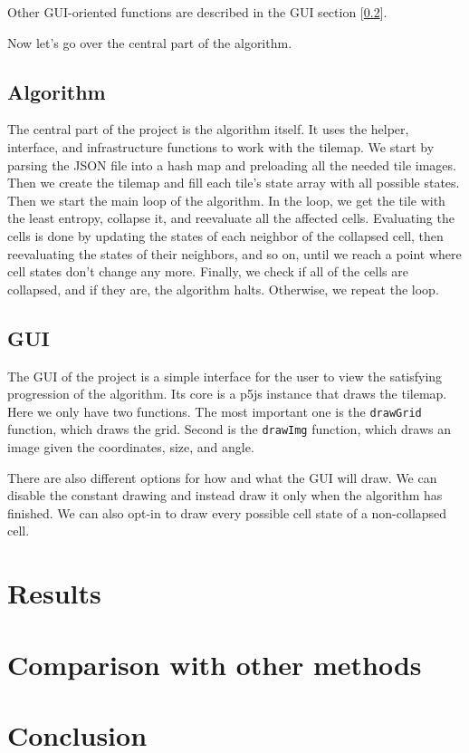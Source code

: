 \documentclass[10pt,twoside,a4paper]{article}
\begin{document}
Other GUI-oriented functions are described in the GUI section [\ref*{sec:gui}].

Now let's go over the central part of the algorithm.


\subsection{Algorithm}\label{sec:algorithm}
The central part of the project is the algorithm itself.
It uses the helper, interface, and infrastructure functions to work with the tilemap.
We start by parsing the JSON file into a hash map and preloading all the needed tile images.
Then we create the tilemap and fill each tile's state array with all possible states.
Then we start the main loop of the algorithm.
In the loop, we get the tile with the least entropy, collapse it, and reevaluate all the affected cells.
Evaluating the cells is done by updating the states of each neighbor of the collapsed cell, then reevaluating the states of their neighbors, and so on, until we reach a point where cell states don't change any more.
Finally, we check if all of the cells are collapsed, and if they are, the algorithm halts.
Otherwise, we repeat the loop.

\subsection{GUI}\label{sec:gui}
The GUI of the project is a simple interface for the user to view the satisfying progression of the algorithm.
Its core is a p5js instance that draws the tilemap.
Here we only have two functions. 
The most important one is the \texttt{drawGrid} function, which draws the grid.
Second is the \texttt{drawImg} function, which draws an image given the coordinates, size, and angle.

There are also different options for how and what the GUI will draw.
We can disable the constant drawing and instead draw it only when the algorithm has finished.
We can also opt-in to draw every possible cell state of a non-collapsed cell.


\section{Results}\label{sec:results}
\section{Comparison with other methods}\label{sec:comparison}
\section{Conclusion}\label{sec:conclusion}


\end{document}
